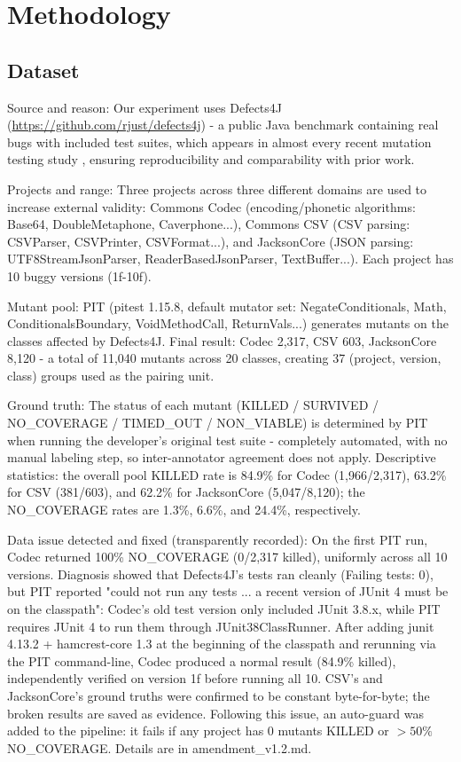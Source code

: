 \section{Methodology}
\subsection{Dataset}

Source and reason: Our experiment uses Defects4J \cite{just2014defects4j} (\url{https://github.com/rjust/defects4j}) - a public Java benchmark containing real bugs with included test suites, which appears in almost every recent mutation testing study \cite{jimenez2018naturalness, kim2022seshat, zhao2024soda, tanhaei2025gemllm, wang2025comprehensive}, ensuring reproducibility and comparability with prior work.

Projects and range: Three projects across three different domains are used to increase external validity: Commons Codec (encoding/phonetic algorithms: Base64, DoubleMetaphone, Caverphone...), Commons CSV (CSV parsing: CSVParser, CSVPrinter, CSVFormat...), and JacksonCore (JSON parsing: UTF8StreamJsonParser, ReaderBasedJsonParser, TextBuffer...). Each project has 10 buggy versions (1f-10f).

Mutant pool: PIT \cite{coles2016pit} (pitest 1.15.8, default mutator set: NegateConditionals, Math, ConditionalsBoundary, VoidMethodCall, ReturnVals...) generates mutants on the classes affected by Defects4J. Final result: Codec 2,317, CSV 603, JacksonCore 8,120 - a total of 11,040 mutants across 20 classes, creating 37 (project, version, class) groups used as the pairing unit.

Ground truth: The status of each mutant (KILLED / SURVIVED / NO\_COVERAGE / TIMED\_OUT / NON\_VIABLE) is determined by PIT when running the developer's original test suite - completely automated, with no manual labeling step, so inter-annotator agreement does not apply. Descriptive statistics: the overall pool KILLED rate is 84.9\% for Codec (1,966/2,317), 63.2\% for CSV (381/603), and 62.2\% for JacksonCore (5,047/8,120); the NO\_COVERAGE rates are 1.3\%, 6.6\%, and 24.4\%, respectively.

Data issue detected and fixed (transparently recorded): On the first PIT run, Codec returned 100\% NO\_COVERAGE (0/2,317 killed), uniformly across all 10 versions. Diagnosis showed that Defects4J's tests ran cleanly (Failing tests: 0), but PIT reported "could not run any tests ... a recent version of JUnit 4 must be on the classpath": Codec's old test version only included JUnit 3.8.x, while PIT requires JUnit 4 to run them through JUnit38ClassRunner. After adding junit 4.13.2 + hamcrest-core 1.3 at the beginning of the classpath and rerunning via the PIT command-line, Codec produced a normal result (84.9\% killed), independently verified on version 1f before running all 10. CSV's and JacksonCore's ground truths were confirmed to be constant byte-for-byte; the broken results are saved as evidence. Following this issue, an auto-guard was added to the pipeline: it fails if any project has 0 mutants KILLED or $>50\%$ NO\_COVERAGE. Details are in amendment\_v1.2.md.


